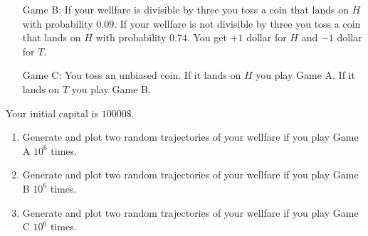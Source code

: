\documentclass[12pt]{article}
\begin{document}
\begin{enumerate}
\begin{enumerate}
        \item[Game B:] If your wellfare is divisible by three you toss a coin that
        lands on $H$ with probability $0.09$. 
        If your wellfare is not divisible by three you toss a coin that lands on $H$ with probability $0.74$.
        You get $+1$ dollar for $H$ and $-1$ dollar for $T$.  
        
        \item[Game C:] You toss an unbiased coin.
        If it lands on $H$ you play Game A. If it lands on $T$ you play Game B. 
    \end{enumerate}
    
    Your initial capital is $10000\$$.

    \begin{enumerate}
        \item Generate and plot two random trajectories of your wellfare if you play Game A $10^6$ times.
        \item Generate and plot two random trajectories of your wellfare if you play Game B $10^6$ times.
        \item Generate and plot two random trajectories of your wellfare if you play Game C $10^6$ times.
    \end{enumerate}
\end{enumerate}
\end{document}
